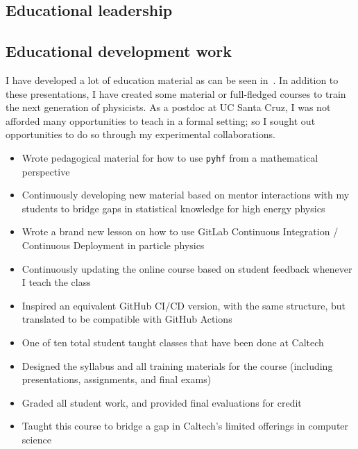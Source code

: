 \subsection{Educational leadership \noneyet}\label{ssec:educational-leadership-noneyet}
\subsection{Educational development work}\label{ssec:educational-development-work}

I have developed a lot of education material as can be seen in~. In addition to these presentations, I have created some material or full-fledged courses to train the next generation of physicists. As a postdoc at UC Santa Cruz, I was not afforded many opportunities to teach in a formal setting; so I sought out opportunities to do so through my experimental collaborations.

\begin{itemize}
	\item Wrote pedagogical material for how to use \texttt{pyhf} from a mathematical perspective
	\item Continuously developing new material based on mentor interactions with my students to bridge gaps in statistical knowledge for high energy physics
\end{itemize}

\begin{itemize}
	\item Wrote a brand new lesson on how to use GitLab Continuous Integration / Continuous Deployment in particle physics
	\item Continuously updating the online course based on student feedback whenever I teach the class
	\item Inspired an equivalent GitHub CI/CD version, with the same structure, but translated to be compatible with GitHub Actions
\end{itemize}

\begin{itemize}
	\item One of ten total student taught classes that have been done at Caltech
	\item Designed the syllabus and all training materials for the course (including presentations, assignments, and final exams)
	\item Graded all student work, and provided final evaluations for credit
	\item Taught this course to bridge a gap in Caltech's limited offerings in computer science
\end{itemize}

